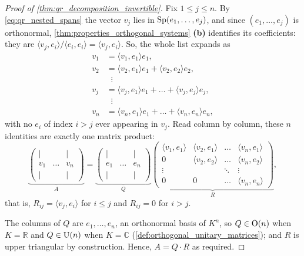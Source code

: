 \begin{proof}[Proof of \cref{thm:qr_decomposition_invertible}]
Fix $1 \le j \le n$. By \eqref{eq:qr_nested_spans} the vector $v_j$ lies in $\operatorname{Sp}(e_1, \dots, e_j)$, and since $(e_1, \dots, e_j)$ is orthonormal, \cref{thm:properties_orthogonal_systems} \textbf{(b)} identifies its coefficients: they are $\langle v_j, e_i \rangle / \langle e_i, e_i \rangle = \langle v_j, e_i \rangle$. So, the whole list expands as
\begin{align*}
    v_1 &= \langle v_1, e_1 \rangle e_1, \\
    v_2 &= \langle v_2, e_1 \rangle e_1 + \langle v_2, e_2 \rangle e_2, \\
        &\;\;\vdots \\
    v_j &= \langle v_j, e_1 \rangle e_1 + \dots + \langle v_j, e_j \rangle e_j, \\
        &\;\;\vdots \\
    v_n &= \langle v_n, e_1 \rangle e_1 + \dots + \langle v_n, e_n \rangle e_n,
\end{align*}
with no $e_i$ of index $i > j$ ever appearing in $v_j$. Read column by column, these $n$ identities are exactly one matrix product:
\[
    \underbrace{\begin{pmatrix} | & & | \\ v_1 & \dots & v_n \\ | & & | \end{pmatrix}}_{A}
    = \underbrace{\begin{pmatrix} | & & | \\ e_1 & \dots & e_n \\ | & & | \end{pmatrix}}_{Q}
      \underbrace{\begin{pmatrix}
        \langle v_1, e_1 \rangle & \langle v_2, e_1 \rangle & \dots & \langle v_n, e_1 \rangle \\
        0 & \langle v_2, e_2 \rangle & \dots & \langle v_n, e_2 \rangle \\
        \vdots & & \ddots & \vdots \\
        0 & 0 & \dots & \langle v_n, e_n \rangle
      \end{pmatrix}}_{R},
\]
that is, $R_{ij} = \langle v_j, e_i \rangle$ for $i \le j$ and $R_{ij} = 0$ for $i > j$.

The columns of $Q$ are $e_1, \dots, e_n$, an orthonormal basis of $K^n$, so $Q \in \operatorname{O}(n)$ when $K = \mathbb{R}$ and $Q \in \operatorname{U}(n)$ when $K = \mathbb{C}$ (\cref{def:orthogonal_unitary_matrices}); and $R$ is upper triangular by construction. Hence, $A = Q \cdot R$ as required.
\end{proof}

